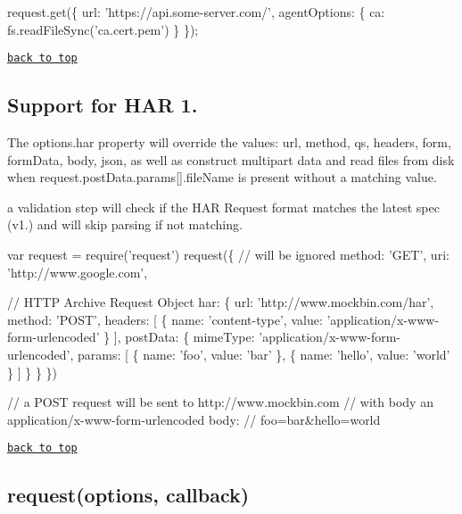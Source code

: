 \begin{DoxyCode}
request.get(\{
    url: 'https://api.some-server.com/',
    agentOptions: \{
        ca: fs.readFileSync('ca.cert.pem')
    \}
\});
\end{DoxyCode}


\href{#table-of-contents}{\tt back to top}





\subsection*{Support for H\+AR 1.}

The {\ttfamily options.\+har} property will override the values\+: {\ttfamily url}, {\ttfamily method}, {\ttfamily qs}, {\ttfamily headers}, {\ttfamily form}, {\ttfamily form\+Data}, {\ttfamily body}, {\ttfamily json}, as well as construct multipart data and read files from disk when {\ttfamily request.\+post\+Data.\+params\mbox{[}\mbox{]}.file\+Name} is present without a matching {\ttfamily value}.

a validation step will check if the H\+AR Request format matches the latest spec (v1.) and will skip parsing if not matching.


\begin{DoxyCode}
var request = require('request')
request(\{
  // will be ignored
  method: 'GET',
  uri: 'http://www.google.com',

  // HTTP Archive Request Object
  har: \{
    url: 'http://www.mockbin.com/har',
    method: 'POST',
    headers: [
      \{
        name: 'content-type',
        value: 'application/x-www-form-urlencoded'
      \}
    ],
    postData: \{
      mimeType: 'application/x-www-form-urlencoded',
      params: [
        \{
          name: 'foo',
          value: 'bar'
        \},
        \{
          name: 'hello',
          value: 'world'
        \}
      ]
    \}
  \}
\})

// a POST request will be sent to http://www.mockbin.com
// with body an application/x-www-form-urlencoded body:
// foo=bar&hello=world
\end{DoxyCode}


\href{#table-of-contents}{\tt back to top}





\subsection*{request(options, callback)}

